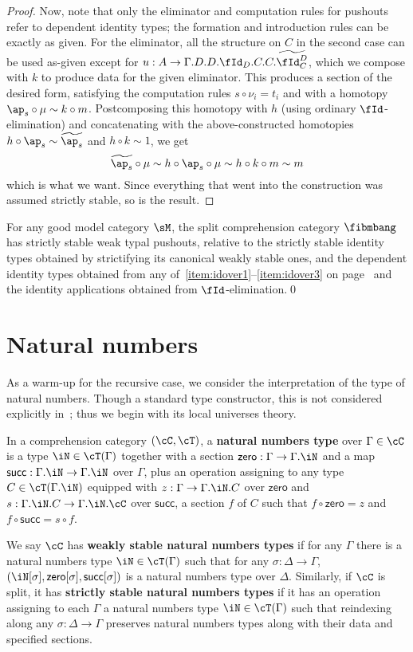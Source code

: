 \documentclass{amsart}
\let\N\iN
\let\C\cC
\let\T\cT
\def\zero{\mathsf{zero}}
\def\succ{\mathsf{succ}}
\let\Id\fId
\newcommand{\Idtwo}[2]{\widetilde{\Id^{#1}_{#2}}}
\newcommand{\aptwo}[1]{\widetilde{\ap_{#1}}}
\begin{document}
\begin{proof}
  Now, note that only the eliminator and computation rules for pushouts refer to dependent identity types; the formation and introduction rules can be exactly as given.
  For the eliminator, all the structure on $C$ in the second case can be used as-given except for $u:A\to \Gamma.D.D.\Id_D.C.C.\Idtwo{D}{C}$, which we compose with $k$ to produce data for the given eliminator.
  This produces a section of the desired form, satisfying the computation rules $s\circ \nu_i = t_i$ and with a homotopy $\ap_s\circ \mu \sim k\circ m$.
  Postcomposing this homotopy with $h$ (using ordinary $\Id$-elimination) and concatenating with the above-constructed homotopies $h\circ \ap_s \sim \aptwo{s}$ and $h\circ k \sim 1$, we get
  \[ \aptwo{s} \circ \mu \sim h\circ \ap_s \circ \mu \sim h\circ k\circ m \sim m \]
  which is what we want.
  Since everything that went into the construction was assumed strictly stable, so is the result.
\end{proof}

\begin{cor}
  For any good model category $\sM$, the split comprehension category $\fibmbang$ has strictly stable weak typal pushouts, relative to the strictly stable identity types obtained by strictifying its canonical weakly stable ones, and the dependent identity types obtained from any of~\ref{item:idover1}--\ref{item:idover3} on page~\pageref{idover} and the identity applications obtained from $\Id$-elimination.\qed
\end{cor}

\section{Natural numbers}
\label{sec:natural-numbers}

As a warm-up for the recursive case, we consider the interpretation of the type of natural numbers.
Though a standard type constructor, this is not considered explicitly in~\cite{lw:localuniv}; thus we begin with its local universes theory.

\begin{defn}
  In a comprehension category $(\C,\T)$, a \textbf{natural numbers type} over $\Gamma\in\C$ is a type $\N\in\T(\Gamma)$ together with a section $\zero:\Gamma\to\Gamma.\N$ and a map $\succ:\Gamma.\N\to\Gamma.\N$ over $\Gamma$, plus an operation assigning to any type $C\in\T(\Gamma.\N)$ equipped with $z:\Gamma\to\Gamma.\N.C$ over $\zero$ and $s:\Gamma.\N.C \to \Gamma.\N.\C$ over $\succ$, a section $f$ of $C$ such that $f \circ \zero = z$ and $f\circ \succ = s \circ f$.

  We say $\C$ has \textbf{weakly stable natural numbers types} if for any $\Gamma$ there is a natural numbers type $\N\in\T(\Gamma)$ such that for any $\sigma:\Delta\to\Gamma$, $(\N[\sigma],\zero[\sigma],\succ[\sigma])$ is a natural numbers type over $\Delta$.
  Similarly, if $\C$ is split, it has \textbf{strictly stable natural numbers types} if it has an operation assigning to each $\Gamma$ a natural numbers type $\N\in\T(\Gamma)$ such that reindexing along any $\sigma:\Delta\to\Gamma$ preserves natural numbers types along with their data and specified sections.
\end{defn}
\end{document}
